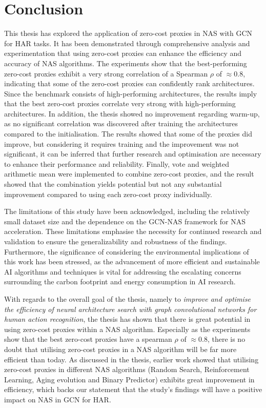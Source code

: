 \section{Conclusion}

This thesis has explored the application of zero-cost proxies in \gls{NAS} with \gls{GCN} for \gls{HAR} tasks. It has been demonstrated through comprehensive analysis and experimentation that using zero-cost proxies can enhance the efficiency and accuracy of \gls{NAS} algorithms. The experiments show that the best-performing zero-cost proxies exhibit a very strong correlation of a Spearman $\rho$ of $\approx 0.8$, indicating that some of the zero-cost proxies can confidently rank architectures. Since the benchmark consists of high-performing architectures, the results imply that the best zero-cost proxies correlate very strong with high-performing architectures. In addition, the thesis showed no improvement regarding warm-up, as no significant correlation was discovered after training the architectures compared to the initialisation. The results showed that some of the proxies did improve, but considering it requires training and the improvement was not significant, it can be inferred that further research and optimisation are necessary to enhance their performance and reliability. Finally, vote and weighted arithmetic mean were implemented to combine zero-cost proxies, and the result showed that the combination yields potential but not any substantial improvement compared to using each zero-cost proxy individually. 
 

The limitations of this study have been acknowledged, including the relatively small dataset size and the dependence on the \gls{GCN}-\gls{NAS} framework for \gls{NAS} acceleration. These limitations emphasise the necessity for continued research and validation to ensure the generalizability and robustness of the findings. Furthermore, the significance of considering the environmental implications of this work has been stressed, as the advancement of more efficient and sustainable AI algorithms and techniques is vital for addressing the escalating concerns surrounding the carbon footprint and energy consumption in AI research.

With regards to the overall goal of the thesis, namely to \textit{improve and optimise the efficiency of neural architecture search with
graph convolutional networks for human action recognition}, the thesis has shown that there is great potential in using zero-cost proxies within a \gls{NAS} algorithm. Especially as the experiments show that the best zero-cost proxies have a spearman $\rho$ of $\approx 0.8$, there is no doubt that utilising zero-cost proxies in a \gls{NAS} algorithm will be far more efficient than today. As discussed in the thesis, earlier work showed that utilising zero-cost proxies in different \gls{NAS} algorithms (Random Search, Reinforcement Learning, Aging evolution and Binary Predictor) exhibits great improvement in efficiency, which backs our statement that the study's findings will have a positive impact on \gls{NAS} in \gls{GCN} for \gls{HAR}.